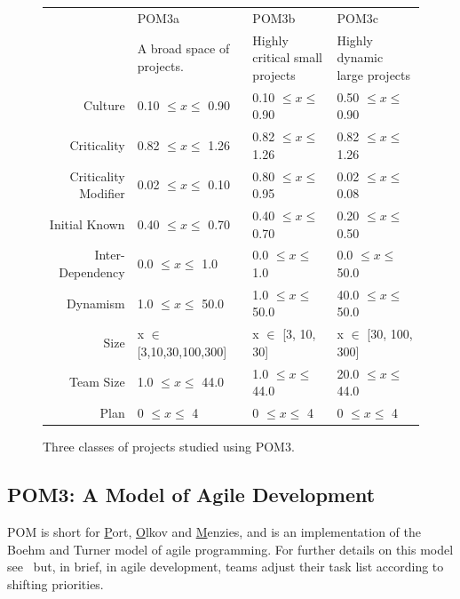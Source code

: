 \documentclass[10pt,journal,compsoc]{IEEEtran}
\begin{document}
\begin{figure}%
\footnotesize
\begin{center}
    \begin{tabular}{r|p{1.5in}|p{1.5in}|p{1.5in}}
                     & POM3a                         & POM3b             &POM3c       \\ 
                             & A broad space of projects. & Highly critical small projects& Highly dynamic large projects\\\hline
        Culture              & 0.10 $\leq x \leq$ 0.90       & 0.10 $\leq x \leq$ 0.90  & 0.50 $\leq x \leq$ 0.90  \\ 
        Criticality          & 0.82 $\leq x \leq$ 1.26       & 0.82 $\leq x \leq$ 1.26   & 0.82 $\leq x \leq$ 1.26  \\ 
        Criticality Modifier & 0.02 $\leq x \leq$ 0.10       & 0.80 $\leq x \leq$ 0.95 & 0.02 $\leq x \leq$ 0.08   \\ 
        Initial Known        & 0.40 $\leq x \leq$ 0.70       & 0.40 $\leq x \leq$ 0.70  & 0.20 $\leq x \leq$ 0.50  \\ 
        Inter-Dependency     & 0.0   $\leq x \leq$ 1.0       & 0.0   $\leq x \leq$ 1.0  & 0.0   $\leq x \leq$ 50.0 \\ 
        Dynamism             & 1.0   $\leq x \leq$ 50.0      & 1.0   $\leq x \leq$ 50.0  & 40.0   $\leq x \leq$ 50.0 \\ 
        Size                 & x $\in$ [3,10,30,100,300] & x $\in$ [3, 10, 30]     & x $\in$ [30, 100, 300]   \\ 
        Team Size            & 1.0 $\leq x \leq$ 44.0        & 1.0 $\leq x \leq$ 44.0  & 20.0 $\leq x \leq$ 44.0    \\ 
        Plan                 & 0 $\leq x \leq$ 4             & 0 $\leq x \leq$ 4    & 0 $\leq x \leq$ 4       
\end{tabular}
\end{center}

\caption{Three classes of projects studied using POM3. }\label{fig:POM3abcd}
\end{figure}




\subsection{POM3: A Model of Agile Development}\label{sec:pom3pom3}POM is short for \underline{P}ort, \underline{O}lkov and \underline{M}enzies, and is an implementation of the Boehm and Turner model of agile programming. 
For further details on this model see~\cite{port08,1204376,turner03} but, in brief, in agile development, teams adjust their task list according to shifting priorities.
\end{document}
